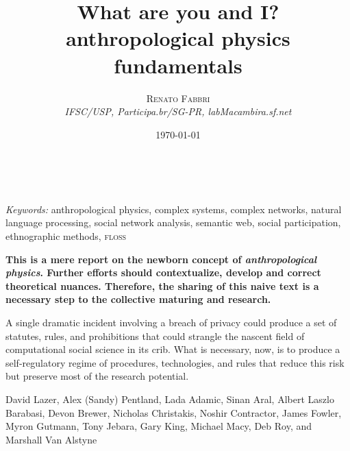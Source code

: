 \documentclass[a4paper, 11pt]{article} %
\title{\textbf{What are you and I?}\\ %
anthropological physics fundamentals} %
\author{\textsc{Renato Fabbri} %
\\{\textit{IFSC/USP, Participa.br/SG-PR, labMacambira.sf.net}}} %
\date{\today} %
\makeatletter
\newcommand{\floss}{\textsc{floss}}
\renewcommand{\maketitle}{ %
\begin{flushright} %
{\LARGE\@title} %

\vspace{50pt} %

{\large\@author} %
\\\@date %

\vspace{40pt} %
\end{flushright}
}
\makeatother
\begin{document}
\maketitle %



%
%
%

\hspace*{3,6mm}\textit{Keywords:} anthropological physics, complex systems, complex networks, natural language processing, social network analysis, semantic web, social participation, ethnographic methods, \floss


\vspace*{1cm}
{\bf This is a mere report on the newborn concept of \emph{anthropological physics}. Further efforts should contextualize, develop and correct theoretical nuances. Therefore, the sharing of this naive text is a necessary step to the collective maturing and research.}
\vspace*{.6cm}

\newpage
\epigraph{A single dramatic incident involving a breach of privacy could produce a set of statutes, rules, and prohibitions that could strangle the nascent field of computational social science in its crib. What is necessary, now, is to produce a self-regulatory regime of procedures, technologies, and rules that reduce this risk but preserve most of the research potential.}{David Lazer, Alex (Sandy) Pentland, Lada Adamic, Sinan Aral, Albert Laszlo Barabasi, Devon Brewer, Nicholas Christakis, Noshir Contractor, James Fowler, Myron Gutmann, Tony Jebara, Gary King, Michael Macy, Deb Roy, and Marshall Van Alstyne~\cite{life}}
\end{document}
